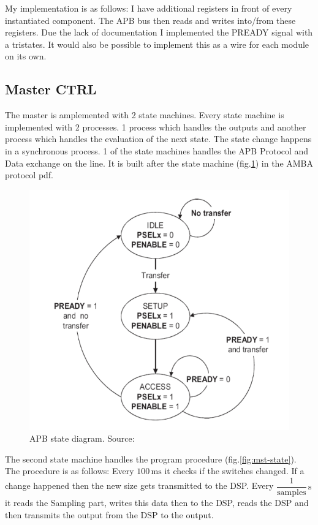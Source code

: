 My implementation is as follows: I have additional registers in front of every
instantiated component. The APB bus then reads and writes into/from these 
registers. Due the lack of documentation I implemented the PREADY signal with
a tristates. It would also be possible to implement this as a wire for each
module on its own.

\subsection{Master CTRL}
The master is amplemented with 2 state machines. 
Every state machine is implemented with 2 processes. 1 process
which handles the outputs and another process which handles
the evaluation of the next state. The state change happens in
a synchronous process.
1 of the state
machines handles the APB Protocol and Data exchange on the line. 
It is built after the state machine (fig.\ref{fig:apb-state}) in the AMBA protocol pdf.

\begin{figure}[ht]
    \centering
    \includegraphics[scale=0.3]{fig/apb-state-diag.png}
    \caption{APB state diagram. Source:\protect\autocite{apb}}
    \label{fig:apb-state}
\end{figure}

The second state machine handles the program procedure (fig.\ref{fig:mst-state}). The 
procedure is as follows: Every $100\,\text{ms}$ it checks if
the switches changed. If a change happened then the new size
gets transmitted to the DSP. Every 
$\dfrac{1}{\text{samples}}\,\text{s}$ it reads the
Sampling part, writes this data then to the DSP, reads the DSP
and then transmits the output from the DSP to the output.

